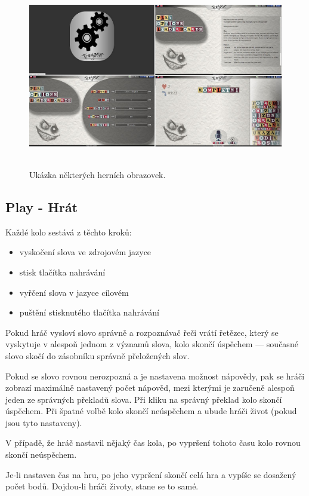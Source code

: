 \begin{figure}[h]
	\centering
	\includegraphics[width=140mm,height=80mm]{img/trogasr.jpg}
	\caption{Ukázka některých herních obrazovek.}
	\label{fig:trogasr}
\end{figure}

\subsection{Play - Hrát}

Každé kolo sestává z těchto kroků:

\begin{itemize}
\item vyskočení slova ve zdrojovém jazyce
\item stisk tlačítka nahrávání
\item vyřčení slova v jazyce cílovém
\item puštění stisknutého tlačítka nahrávání
\end{itemize}

Pokud hráč vysloví slovo správně a rozpoznávač řeči vrátí řetězec, který se vyskytuje v alespoň jednom z významů slova, kolo skončí úspěchem --- současné slovo skočí do zásobníku správně přeložených slov.

Pokud se slovo rovnou nerozpozná a je nastavena možnost nápovědy, pak se hráči zobrazí maximálně nastavený počet nápověd, mezi kterými je zaručeně alespoň jeden ze správných překladů slova. Při kliku na správný překlad kolo skončí úspěchem. Při špatné volbě kolo skončí neúspěchem a ubude hráči život (pokud jsou tyto nastaveny).

V případě, že hráč nastavil nějaký čas kola, po vypršení tohoto času kolo rovnou skončí neúspěchem.

Je-li nastaven čas na hru, po jeho vypršení skončí celá hra a vypíše se dosažený počet bodů. Dojdou-li hráči životy, stane se to samé.

